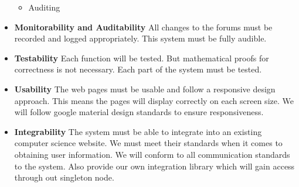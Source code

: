 \begin{itemize}
\begin{itemize}
			\item Auditing
		\end{itemize}
	\item \textbf{Monitorability and Auditability}
		All changes to the forums must be recorded and logged appropriately. This system must be fully audible. 
	\item \textbf{Testability}
		Each function will be tested. But mathematical proofs for correctness is not necessary. Each part of the system must be tested. 
	\item \textbf{Usability}
		The web pages must be usable and follow a responsive design approach. This means the pages will display correctly on each screen size. We will follow google material design standards to ensure responsiveness.
	\item \textbf{Integrability}
		The system must be able to integrate into an existing computer science website. We must meet their standards when it comes to obtaining user information. We will conform to all communication standards to the system. Also provide our own integration library which will gain access through out singleton node.
\end{itemize}

%